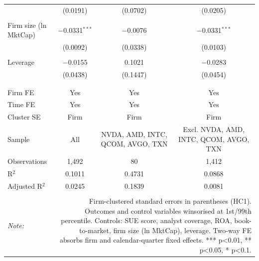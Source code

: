 \begin{table}[!htbp]
\begin{tabular}{@{\extracolsep{5pt}}lccc}
  & (0.0191) & (0.0702) & (0.0205) \\ 
  & & & \\ 
 Firm size (ln MktCap) & $-$0.0331$^{***}$ & $-$0.0076 & $-$0.0331$^{***}$ \\ 
  & (0.0092) & (0.0338) & (0.0103) \\ 
  & & & \\ 
 Leverage & $-$0.0155 & 0.1021 & $-$0.0283 \\ 
  & (0.0438) & (0.1447) & (0.0454) \\ 
  & & & \\ 
\hline \\[-1.8ex] 
Firm FE & Yes & Yes & Yes \\ 
Time FE & Yes & Yes & Yes \\ 
Cluster SE & Firm & Firm & Firm \\ 
Sample & All & NVDA, AMD, INTC, QCOM, AVGO, TXN & Excl. NVDA, AMD, INTC, QCOM, AVGO, TXN \\ 
Observations & 1,492 & 80 & 1,412 \\ 
R$^{2}$ & 0.1011 & 0.4731 & 0.0868 \\ 
Adjusted R$^{2}$ & 0.0245 & 0.1839 & 0.0081 \\ 
\hline 
\hline \\[-1.8ex] 
\textit{Note:}  & \multicolumn{3}{r}{Firm-clustered standard errors in parentheses (HC1). Outcomes and control variables winsorised at 1st/99th percentile. Controls: SUE score, analyst coverage, ROA, book-to-market, firm size (ln MktCap), leverage. Two-way FE absorbs firm and calendar-quarter fixed effects. *** p<0.01, ** p<0.05, * p<0.1.} \\ 
\end{tabular} 
\end{table} 
